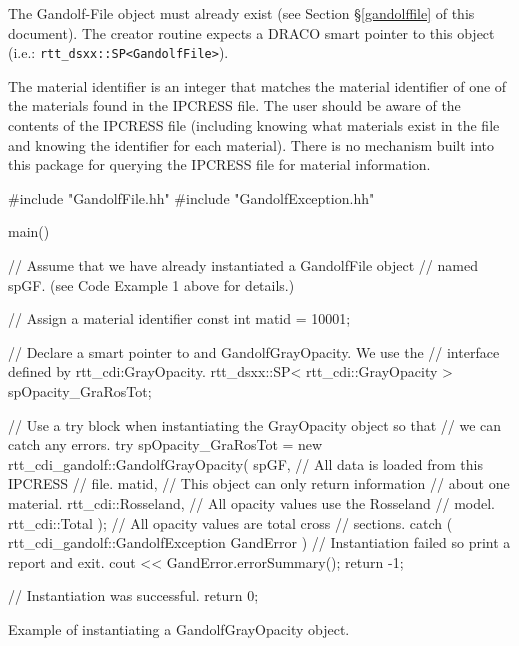 \documentclass[11pt]{nmemo}
\newenvironment{codeExample}
{\footnotesize 
  \VerbatimEnvironment
  \begin{SaveVerbatim}{\mycode}}%
  {\end{SaveVerbatim}%
  \noindent%
  \parashade[.950]{sharpcorners}{\gdef\outlineboxwidth{.5}%
    \UseVerbatim{\mycode}}\normalsize}
\begin{document}
The Gandolf-File object must already exist (see Section
\S\ref{gandolffile} of this document).  The creator routine expects a
DRACO smart pointer to this object (i.e.: \texttt{rtt\_dsxx::SP<GandolfFile>}).

The material identifier is an integer that matches the material
identifier of one of the materials found in the IPCRESS file.  The
user should be aware of the contents of the IPCRESS file (including
knowing what materials exist in the file and knowing the identifier
for each material).  There is no mechanism built into this package for
querying the IPCRESS file for material information.


\begin{cxxSampleCode}
\begin{codeExample}
#include "GandolfFile.hh"
#include "GandolfException.hh"

main()
{
   // Assume that we have already instantiated a GandolfFile object 
   // named spGF. (see Code Example 1 above for details.)

   // Assign a material identifier
   const int matid = 10001;
        
   // Declare a smart pointer to and GandolfGrayOpacity.  We use the
   // interface defined by rtt_cdi:GrayOpacity.
   rtt_dsxx::SP< rtt_cdi::GrayOpacity > spOpacity_GraRosTot;
        
   // Use a try block when instantiating the GrayOpacity object so that
   // we can catch any errors.
   try
      {
         spOpacity_GraRosTot = new 
            rtt_cdi_gandolf::GandolfGrayOpacity( 
               spGF,   // All data is loaded from this IPCRESS
                       // file.
               matid,  // This object can only return information 
                       // about one material.
               rtt_cdi::Rosseland,     // All opacity values use the Rosseland 
                                       // model.
               rtt_cdi::Total );       // All opacity values are total cross 
                                       // sections.
      }
   catch ( rtt_cdi_gandolf::GandolfException GandError )
      {
         // Instantiation failed so print a report and exit.
         cout << GandError.errorSummary();
         return -1;
      }

   // Instantiation was successful.
   return 0;
}
\end{codeExample}
\caption{Example of instantiating a GandolfGrayOpacity object.}
\label{codeExample:gandolfGrayInstantiation}
\end{cxxSampleCode}
\end{document}
